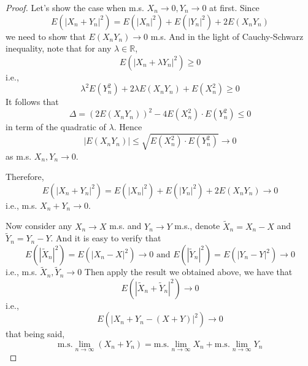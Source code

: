 \documentclass{homework}
\begin{document}
    \problem
    \begin{proof}
        Let's show the case when m.s. $X_n\to 0,Y_n\to 0$ at first.
        Since
        \[E(|X_n+Y_n|^2)=E(|X_n|^2)+E(|Y_n|^2)+2E(X_nY_n)\]
        we need to show that $E(X_nY_n)\to 0$ m.s.
        And in the light of Cauchy-Schwarz inequality, note that
        for any $\lambda\in\mathbb R$,
        \[E(|X_n+\lambda Y_n|^2)\geq 0\]
        i.e.,
        \[\lambda^2E(Y_n^2)+2\lambda E(X_nY_n)+E(X_n^2)\geq 0\]
        It follows that
        \[\Delta=(2E(X_nY_n))^2-4E(X_n^2)\cdot E(Y_n^2)\leq 0\]
        in term of the quadratic of $\lambda$. Hence
        \[|E(X_nY_n)|\leq\sqrt{E(X_n^2)\cdot E(Y_n^2)}\to 0\]
        as m.s. $X_n,Y_n\to 0$.

        Therefore,
        \[E(|X_n+Y_n|^2)=E(|X_n|^2)+E(|Y_n|^2)+2E(X_nY_n)\to 0\]
        i.e., m.s. $X_n+Y_n\to 0$.

        Now consider any $X_n\to X$ m.s. and $Y_n\to Y$ m.s.,
        denote $\tilde X_n=X_n-X$ and $\tilde Y_n=Y_n-Y$.
        And it is easy to verify that
        \[E(|\tilde X_n|^2)=E(|X_n-X|^2)\to 0
        \text{ and }
        E(|\tilde Y_n|^2)=E(|Y_n-Y|^2)\to 0 \]
        i.e., m.s. $\tilde X_n,\tilde Y_n\to 0$
        Then apply the result we obtained above, we have that
        \[E(|\tilde X_n+\tilde Y_n|^2)\to 0\]
        i.e.,
        \[E(|X_n+Y_n-(X+Y)|^2)\to 0\]
        that being said,
        \[\text{m.s.}\lim_{n\to\infty}(X_n+Y_n)
        =\text{m.s.}\lim_{n\to\infty}X_n
        +\text{m.s.}\lim_{n\to\infty}Y_n\]
    \end{proof}
\end{document}
